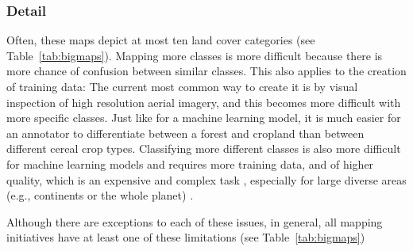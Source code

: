     \subsubsection{Detail}
        Often, these maps depict at most ten land cover categories (see Table~\ref{tab:bigmaps}). Mapping more classes is more difficult because there is more chance of confusion between similar classes. This also applies to the creation of training data: The current most common way to create it is by visual inspection of high resolution aerial imagery, and this becomes more difficult with more specific classes. Just like for a machine learning model, it is much easier for an annotator to differentiate between a forest and cropland than between different cereal crop types. Classifying more different classes is also more difficult for machine learning models and requires more training data, and of higher quality, which is an expensive and complex task \citep{li2021improving}, especially for large diverse areas (e.g., continents or the whole planet) \citep{tsendbazar2021towards,stanimirova2023global}. 

    Although there are exceptions to each of these issues, in general, all mapping initiatives have at least one of these limitations (see Table\@~\ref{tab:bigmaps})

